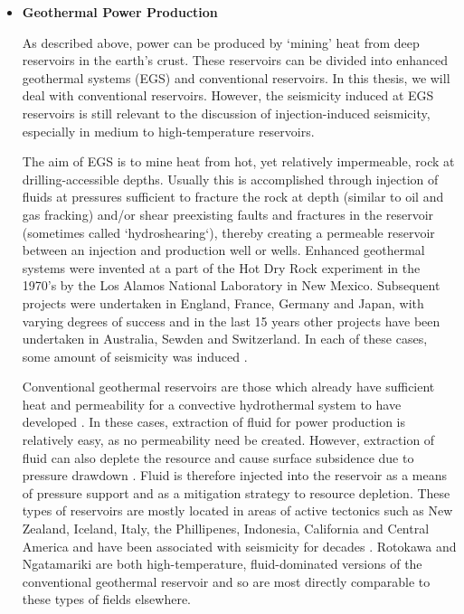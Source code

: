 \begin{itemize}
  \item{\textbf{Geothermal Power Production}}
  
  As described above, power can be produced by `mining' heat from deep reservoirs in the earth's crust. These reservoirs can be divided into enhanced geothermal systems (EGS) and conventional reservoirs. In this thesis, we will deal with conventional reservoirs. However, the seismicity induced at EGS reservoirs is still relevant to the discussion of injection-induced seismicity, especially in medium to high-temperature reservoirs.
  
  The aim of EGS is to mine heat from hot, yet relatively impermeable, rock at drilling-accessible depths. Usually this is accomplished through injection of fluids at pressures sufficient to fracture the rock at depth (similar to oil and gas fracking) and/or shear preexisting faults and fractures in the reservoir (sometimes called `hydroshearing`), thereby creating a permeable reservoir between an injection and production well or wells. Enhanced geothermal systems were invented at a part of the Hot Dry Rock experiment in the 1970's by the Los Alamos National Laboratory \citep{2013} in New Mexico. Subsequent projects were undertaken in England, France, Germany and Japan, with varying degrees of success and in the last 15 years other projects have been undertaken in Australia, Sewden and Switzerland. In each of these cases, some amount of seismicity was induced \citep{2013,Baria_1989,Baisch_2006,Evans_2004,Deichmann_2009}.
  
  Conventional geothermal reservoirs are those which already have sufficient heat and permeability for a convective hydrothermal system to have developed \citep{Grant_2011}. In these cases, extraction of fluid for power production is relatively easy, as no permeability need be created. However, extraction of fluid can also deplete the resource and cause surface subsidence due to pressure drawdown \citep{Grant_2011}. Fluid is therefore injected into the reservoir as a means of pressure support and as a mitigation strategy to resource depletion. These types of reservoirs are mostly located in areas of active tectonics such as New Zealand, Iceland, Italy, the Phillipenes, Indonesia, California and Central America and have been associated with seismicity for decades \citep[e.g.][]{Batini_1985,Allis_1982}. Rotokawa and Ngatamariki are both high-temperature, fluid-dominated versions of the conventional geothermal reservoir and so are most directly comparable to these types of fields elsewhere.
\end{itemize}

